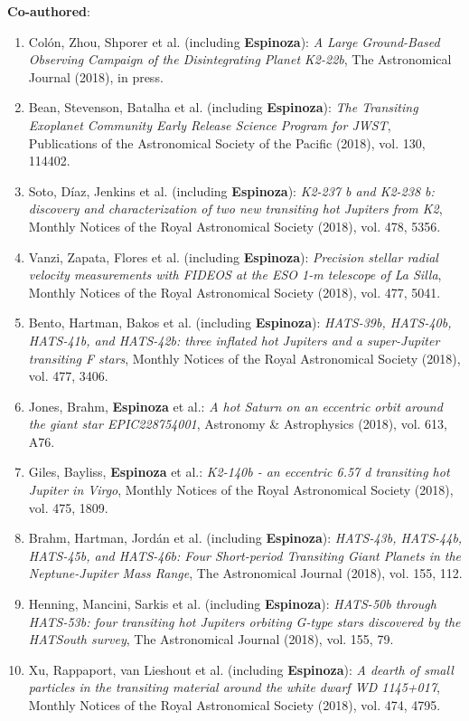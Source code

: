 \documentclass[11pt, a4paper]{article} %
\begin{document}
\begin{flushleft}
\textbf{Co-authored}:
\begin{enumerate}
\setlength\itemsep{0.05cm}
\item Col\'on, Zhou, Shporer et al. (including \textbf{Espinoza}): \textit{A Large Ground-Based Observing Campaign of the Disintegrating Planet K2-22b}, The Astronomical Journal (2018), in press.
\item Bean, Stevenson, Batalha et al. (including \textbf{Espinoza}): \textit{The Transiting Exoplanet Community Early Release Science Program for JWST}, Publications of the Astronomical Society of the Pacific (2018), vol. 130, 114402.
\item Soto, D\'iaz, Jenkins et al. (including \textbf{Espinoza}): \textit{K2-237 b and K2-238 b: discovery and characterization of two new transiting hot Jupiters from K2},  Monthly Notices of the Royal Astronomical Society (2018), vol. 478, 5356.
\item Vanzi, Zapata, Flores et al. (including \textbf{Espinoza}): \textit{Precision stellar radial velocity measurements with FIDEOS at the ESO 1-m telescope of La Silla},  Monthly Notices of the Royal Astronomical Society (2018), vol. 477, 5041.
\item Bento, Hartman, Bakos et al. (including \textbf{Espinoza}): \textit{HATS-39b, HATS-40b, HATS-41b, and HATS-42b: three inflated hot Jupiters and a super-Jupiter transiting F stars},  Monthly Notices of the Royal Astronomical Society (2018), vol. 477, 3406.
\item Jones, Brahm, \textbf{Espinoza} et al.: \textit{A hot Saturn on an eccentric orbit around the giant star EPIC228754001},  Astronomy \& Astrophysics (2018), vol. 613, A76.
\item Giles, Bayliss, \textbf{Espinoza} et al.: \textit{K2-140b - an eccentric 6.57 d transiting hot Jupiter in Virgo}, 
Monthly Notices of the Royal Astronomical Society (2018), vol. 475, 1809.
\item Brahm, Hartman, Jord\'an et al. (including \textbf{Espinoza}): \textit{	HATS-43b, HATS-44b, HATS-45b, and HATS-46b: Four Short-period Transiting Giant Planets in the Neptune-Jupiter Mass Range}, The Astronomical Journal (2018), vol. 155, 112.
\item Henning, Mancini, Sarkis et al. (including \textbf{Espinoza}): \textit{HATS-50b through HATS-53b: four transiting hot Jupiters orbiting G-type stars discovered by the HATSouth survey}, The Astronomical Journal (2018), vol. 155, 79.
\item Xu, Rappaport, van Lieshout et al. (including \textbf{Espinoza}): \textit{A dearth of small particles in the transiting material around the white dwarf WD 1145+017}, Monthly Notices of the Royal Astronomical Society (2018), vol. 474, 4795.

\end{enumerate}
\end{flushleft}
\end{document}
